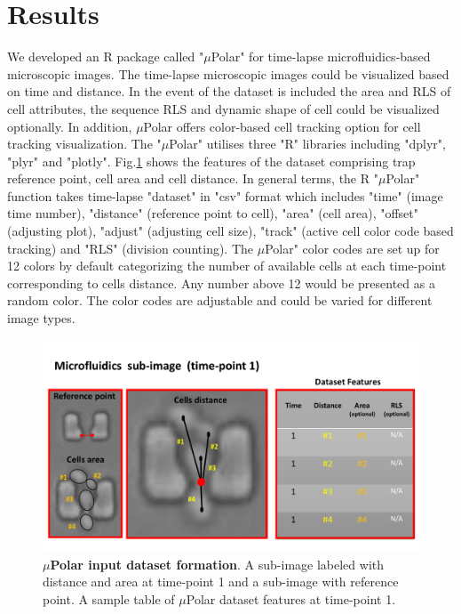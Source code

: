 \documentclass[conference]{IEEEtran}
\begin{document}
\section{Results}

We developed an R package called "$\mu$Polar" for time-lapse microfluidics-based microscopic images. The time-lapse microscopic images could be visualized based on time and distance. In the event of the dataset is included the area and RLS of cell attributes, the sequence RLS and dynamic shape of cell could be visualized optionally. In addition, $\mu$Polar offers color-based cell tracking option for cell tracking visualization. The "$\mu$Polar" utilises three "R" libraries including "dplyr", "plyr" and "plotly". Fig.\ref{fig:table} shows the features of the dataset comprising trap reference point, cell area and cell distance. In general terms, the R "$\mu$Polar" function takes time-lapse "dataset" in "csv" format which includes "time" (image time number), "distance" (reference point to cell), "area" (cell area), "offset" (adjusting plot), "adjust" (adjusting cell size), "track" (active cell color code based tracking) and "RLS" (division counting). The $\mu$Polar" color codes are set up for 12 colors  by default categorizing the number of available cells at each time-point corresponding to cells distance. Any number above 12 would be presented as a random color. The color codes are adjustable and could be varied for different image types.  

\begin{figure}
\centering
\includegraphics[width=\textwidth,height=10 cm]{Patterns/table.pdf}
\caption{ \textbf{ $\mu$Polar input dataset formation}. A sub-image labeled with distance and area at time-point 1 and a sub-image with reference point. A sample table of $\mu$Polar dataset features at time-point 1.}
\label{fig:table}
\end{figure}
\end{document}
